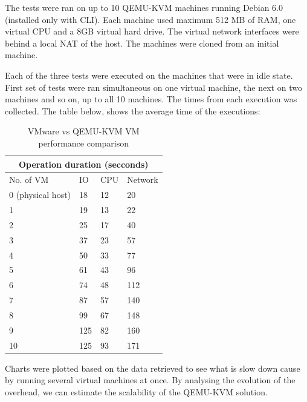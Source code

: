 The tests were ran on up to 10 QEMU-KVM machines running Debian 6.0
(installed only with CLI). Each machine used maximum 512 MB of RAM, one
virtual CPU and a 8GB virtual hard drive.  The virtual network interfaces
were behind a local NAT of the host. The machines were cloned from an
initial machine.

Each of the three tests were executed on the machines that were in idle
state. First set of tests were ran simultaneous on one virtual machine, the
next on two machines and so on, up to all 10 machines. The times from each
execution was collected. The table below, shows the average time of the
executions:

\begin{table}
\begin{tabular}{|l|l|l|l|}
\hline
\multicolumn{4}{|c|}{Operation duration (secconds)} \\
\hline
No. of VM & IO & CPU & Network \\
\hline
0 (physical host) & 18 & 12 & 20\\
\hline
 1 & 19 & 13 & 22\\
 2 & 25 & 17 & 40\\
 3 & 37 & 23 & 57\\
 4 & 50 & 33 & 77\\
 5 & 61 & 43 & 96\\
 6 & 74 & 48 & 112\\
 7 & 87 & 57 & 140\\
 8 & 99 & 67 & 148\\
 9 & 125& 82 & 160\\
10 & 125& 93 & 171\\
\hline
\end{tabular}
\caption{VMware vs QEMU-KVM VM performance comparison}
\label{table:virt_performance_comparison}
\end{table}



Charts were plotted based on the data retrieved to see what is slow down
cause by running several virtual machines at once. By analysing the
evolution of the overhead, we can estimate the scalability of the QEMU-KVM
solution.


